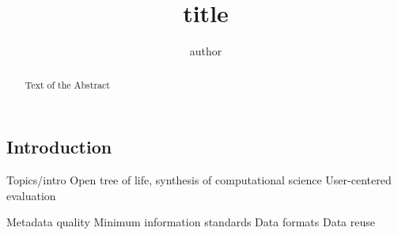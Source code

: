 \documentclass[12pt]{scrartcl}
\title{title}
\author{author}
\begin{document}
%
%

\maketitle
\thispagestyle{fancy}

\begin{multicols}{2}

\begin{abstract}
Text of the Abstract
\end{abstract}


\section{Introduction}
Topics/intro
Open tree of life, synthesis of computational science
User-centered evaluation

Metadata quality
Minimum information standards
Data formats
Data reuse

\end{multicols}
\end{document}
